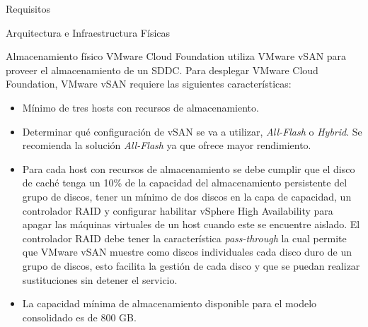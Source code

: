 \begin{section}{Requisitos}
\begin{subsection}{Arquitectura e Infraestructura Físicas \cite{CFfisInfraestuctura}}
\begin{subsubsection}{Almacenamiento físico}
VMware Cloud Foundation utiliza VMware vSAN para proveer el almacenamiento de un SDDC. Para desplegar VMware Cloud Foundation, VMware vSAN requiere las siguientes características:
\begin{itemize}
    \item Mínimo de tres hosts con recursos de almacenamiento.
    \item Determinar qué configuración de vSAN se va a utilizar, \textit{All-Flash} o \textit{Hybrid}. Se recomienda la solución \textit{All-Flash} ya que ofrece mayor rendimiento.
    \item Para cada host con recursos de almacenamiento se debe cumplir que el disco de caché tenga un 10\% de la capacidad del almacenamiento persistente del grupo de discos, tener un mínimo de dos discos en la capa de capacidad, un controlador RAID y configurar habilitar vSphere High Availability  para apagar las máquinas virtuales de un host cuando este se encuentre aislado. El controlador RAID debe tener la característica \textit{pass-through} la cual permite que VMware vSAN muestre como discos individuales cada disco duro de un grupo de discos, esto facilita la gestión de cada disco y que se puedan realizar sustituciones sin detener el servicio.
    \item La capacidad mínima de almacenamiento disponible para el modelo consolidado es de 800 GB. 
\end{itemize}

\end{subsubsection}

\end{subsection}

\end{section}
